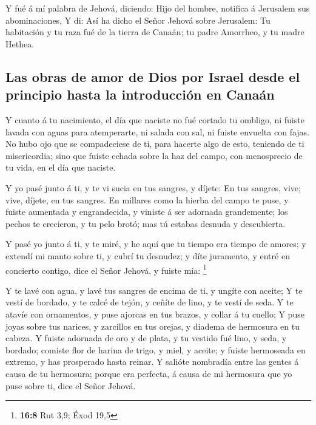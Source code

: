  Y fué á mí palabra de Jehová, diciendo:  Hijo
del hombre, notifica á Jerusalem sus abominaciones,  Y di:
Así ha dicho el Señor Jehová sobre Jerusalem: Tu habitación y tu raza
fué de la tierra de Canaán; tu padre Amorrheo, y tu madre Hethea.

\hypertarget{las-obras-de-amor-de-dios-por-israel-desde-el-principio-hasta-la-introducciuxf3n-en-canauxe1n}{%
\subsection{Las obras de amor de Dios por Israel desde el principio
hasta la introducción en
Canaán}\label{las-obras-de-amor-de-dios-por-israel-desde-el-principio-hasta-la-introducciuxf3n-en-canauxe1n}}

 Y cuanto á tu nacimiento, el día que naciste no fué cortado
tu ombligo, ni fuiste lavada con aguas para atemperarte, ni salada con
sal, ni fuiste envuelta con fajas.  No hubo ojo que se
compadeciese de ti, para hacerte algo de esto, teniendo de ti
misericordia; sino que fuiste echada sobre la haz del campo, con
menosprecio de tu vida, en el día que naciste.

 Y yo pasé junto á ti, y te vi sucia en tus sangres, y
díjete: En tus sangres, vive; vive, díjete, en tus sangres. 
En millares como la hierba del campo te puse, y fuiste aumentada y
engrandecida, y viniste á ser adornada grandemente; los pechos te
crecieron, y tu pelo brotó; mas tú estabas desnuda y descubierta.

 Y pasé yo junto á ti, y te miré, y he aquí que tu tiempo
era tiempo de amores; y extendí mi manto sobre ti, y cubrí tu desnudez;
y díte juramento, y entré en concierto contigo, dice el Señor Jehová, y
fuiste mía: \footnote{\textbf{16:8} Rut 3,9; Éxod 19,5}

 Y te lavé con agua, y lavé tus sangres de encima de ti, y
ungíte con aceite;  Y te vestí de bordado, y te calcé de
tejón, y ceñíte de lino, y te vestí de seda.  Y te atavíe
con ornamentos, y puse ajorcas en tus brazos, y collar á tu cuello;
 Y puse joyas sobre tus narices, y zarcillos en tus orejas,
y diadema de hermosura en tu cabeza.  Y fuiste adornada de
oro y de plata, y tu vestido fué lino, y seda, y bordado; comiste flor
de harina de trigo, y miel, y aceite; y fuiste hermoseada en extremo, y
has prosperado hasta reinar.  Y salióte nombradía entre las
gentes á causa de tu hermosura; porque era perfecta, á causa de mi
hermosura que yo puse sobre ti, dice el Señor Jehová.

